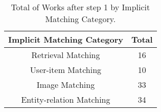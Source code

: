 \begin{table}[ht]
\centering
\begin{tabular}{|c|c|}
\hline
\textbf{Implicit Matching Category} & \textbf{Total} \\
\hline
Retrieval Matching & 16 \\
User-item Matching & 10 \\
Image Matching & 33 \\
Entity-relation Matching & 34 \\
\hline
\end{tabular}
\caption{Total of Works after step 1 by Implicit Matching Category.}
\label{tbl:old_types}
\end{table}
